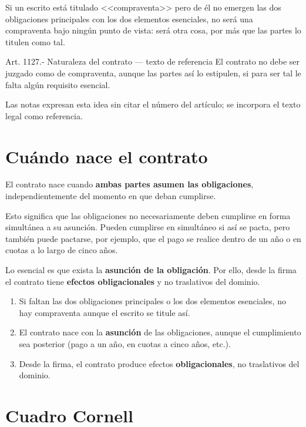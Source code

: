 \documentclass[12pt,oneside]{book}
\begin{document}
Si un escrito está titulado <<compraventa>> pero de él no emergen las dos obligaciones principales con los dos elementos esenciales, no será una compraventa bajo ningún punto de vista: será otra cosa, por más que las partes lo titulen como tal.

\begin{norma}{Art. 1127.- Naturaleza del contrato --- texto de referencia}
El contrato no debe ser juzgado como de compraventa, aunque las partes así lo estipulen, si para ser tal le falta algún requisito esencial.
\end{norma}

Las notas expresan esta idea sin citar el número del artículo; se incorpora el texto legal como referencia.

\section{Cuándo nace el contrato}

El contrato nace cuando \textbf{ambas partes asumen las obligaciones}, independientemente del momento en que deban cumplirse.

Esto significa que las obligaciones no necesariamente deben cumplirse en forma simultánea a su asunción. Pueden cumplirse en simultáneo si así se pacta, pero también puede pactarse, por ejemplo, que el pago se realice dentro de un año o en cuotas a lo largo de cinco años.

Lo esencial es que exista la \textbf{asunción de la obligación}. Por ello, desde la firma el contrato tiene \textbf{efectos obligacionales} y no traslativos del dominio.

\begin{important}
\begin{enumerate}
    \item Si faltan las dos obligaciones principales o los dos elementos esenciales, no hay compraventa aunque el escrito se titule así.
    \item El contrato nace con la \textbf{asunción} de las obligaciones, aunque el cumplimiento sea posterior (pago a un año, en cuotas a cinco años, etc.).
    \item Desde la firma, el contrato produce efectos \textbf{obligacionales}, no traslativos del dominio.
\end{enumerate}
\end{important}

\section{Cuadro Cornell}
\end{document}
